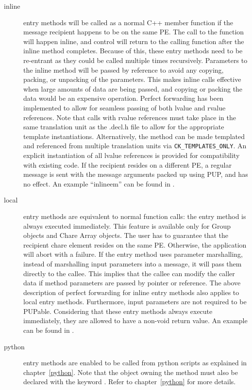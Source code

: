 \begin{description}
\item[inline] entry methods will be called as a normal C++ member function
if the message recipient happens to be on the same PE. The call to the function
will happen inline, and control will return to the calling function after the
inline method completes. Because of this, these entry methods need to be
re-entrant as they could be called multiple times recursively. Parameters to the
inline method will be passed by reference to avoid any copying, packing,
or unpacking of the parameters. This makes inline calls effective when large
amounts of data are being passed, and copying or packing the data would be an
expensive operation.
Perfect forwarding has been implemented to allow for seamless passing of both
lvalue and rvalue references. Note that calls with rvalue references must take
place in the same translation unit as the .decl.h file to allow for the
appropriate template instantiations. Alternatively, the method can be made
templated and referenced from multiple translation units via \texttt{CK\_TEMPLATES\_ONLY}.
An explicit instantiation of all lvalue references is provided for
compatibility with existing code.
If the recipient resides on a different PE, a regular
message is sent with the message arguments packed up using PUP, and 
has no effect. An example ``inlineem'' can be found in .

\item[local] entry methods are equivalent to normal function
calls: the entry method is always executed immediately. This feature is
available only for Group objects and Chare Array objects. The user has to
guarantee that the recipient chare element resides on the same PE. Otherwise,
the application will abort with a failure. If the  entry method uses
parameter marshalling, instead of marshalling input parameters into a message,
it will pass them directly to the callee. This implies that the callee can
modify the caller data if method parameters are passed by pointer or reference.
The above description of perfect forwarding for inline entry methods also
applies to local entry methods.
Furthermore, input parameters are not required to be PUPable. Considering that
these entry methods always execute immediately, they are allowed to have a
non-void return value. An example can be found in .

\item[python] entry methods are enabled to be
called from python scripts as explained in chapter~\ref{python}. Note that the object owning the method must also be declared with the
keyword . Refer to chapter~\ref{python} for more details.


\end{description}
